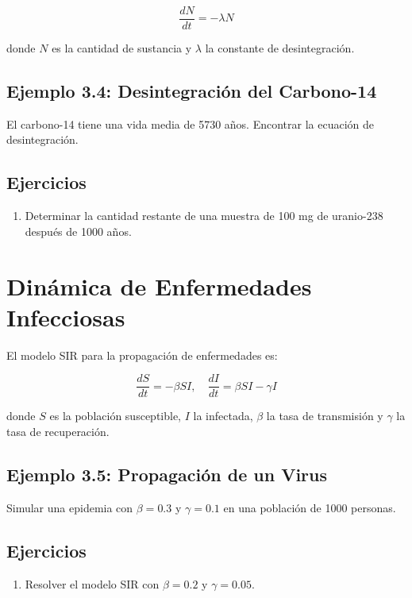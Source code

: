 \begin{equation}
\frac{dN}{dt} = -\lambda N
\end{equation}

donde \( N \) es la cantidad de sustancia y \( \lambda \) la constante de desintegración.

\subsection*{Ejemplo 3.4: Desintegración del Carbono-14}
El carbono-14 tiene una vida media de 5730 años. Encontrar la ecuación de desintegración.

\subsection*{Ejercicios}
\begin{enumerate}
    \item Determinar la cantidad restante de una muestra de 100 mg de uranio-238 después de 1000 años.
\end{enumerate}

\section{Dinámica de Enfermedades Infecciosas}
El modelo SIR para la propagación de enfermedades es:

\begin{equation}
\frac{dS}{dt} = -\beta SI, \quad \frac{dI}{dt} = \beta SI - \gamma I
\end{equation}

donde \( S \) es la población susceptible, \( I \) la infectada, \( \beta \) la tasa de transmisión y \( \gamma \) la tasa de recuperación.

\subsection*{Ejemplo 3.5: Propagación de un Virus}
Simular una epidemia con \( \beta = 0.3 \) y \( \gamma = 0.1 \) en una población de 1000 personas.

\subsection*{Ejercicios}
\begin{enumerate}
    \item Resolver el modelo SIR con \( \beta = 0.2 \) y \( \gamma = 0.05 \).
\end{enumerate}


